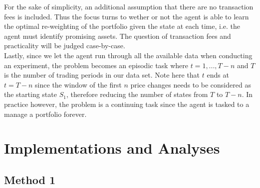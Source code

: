 \documentclass[a4paper,12pt]{article}
\begin{document}
For the sake of simplicity, an additional assumption that there are no transaction fees is included. Thus the focus turns to wether or not the agent is able to learn the optimal re-weighting of the portfolio given the state at each time, i.e. the agent must identify promising assets. The question of transaction fees and practicality will be judged case-by-case. \\

Lastly, since we let the agent run through all the available data when conducting an experiment, the problem becomes an episodic task where $t=1,...,T-n$ and $T$ is the number of trading periods in our data set. Note here that $t$ ends at $t=T-n$ since the window of the first $n$ price changes needs to be considered as the starting state $S_1$, therefore reducing the number of states from $T$ to $T-n$. In practice however, the problem is a continuing task since the agent is tasked to a manage a portfolio forever.

\section{Implementations and Analyses}

\subsection{Method 1}
\end{document}
